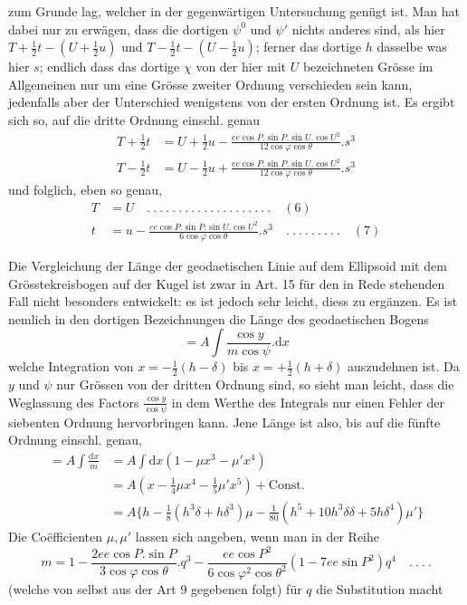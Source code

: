 %
zum Grunde lag, welcher in der gegenwärtigen Untersuchung genügt ist. Man hat dabei nur zu erwägen, dass die dortigen \(\psi^0\) und \(\psi'\) nichts anderes sind, als hier \(T+\frac12t-(U+\frac12u)\) und \(T-\frac12t-(U-\frac12u)\); ferner das dortige \(h\) dasselbe was hier \(s\); endlich dass das dortige \(\chi\) von der hier mit \(U\) bezeichneten Grösse im Allgemeinen nur um eine Grösse zweiter Ordnung verschieden sein kann, jedenfalls aber der Unterschied wenigstens von der ersten Ordnung ist. Es ergibt sich so, auf die dritte Ordnung einschl. genau
\[
\begin{aligned}
T+\tfrac12t&=U+\tfrac12u-\frac{ee\cos P\mathord{.}\sin P\mathord{.}\sin U\mathord{.}\cos U^2}{12\cos\varphi\cos\theta}\mathord{.}s^3\\
T-\tfrac12t&=U-\tfrac12u+\frac{ee\cos P\mathord{.}\sin P\mathord{.}\sin U\mathord{.}\cos U^2}{12\cos\varphi\cos\theta}\mathord{.}s^3
\end{aligned}
\]
und folglich, eben so genau,
\[
\begin{aligned}
T&=U\quad .\ .\ .\ .\ .\ .\ .\ .\ .\ .\ .\ .\ .\ .\ .\ .\ .\ .\ .\ .\quad(6)\\
t&=u-\frac{ee\cos P\mathord{.}\sin P\mathord{.}\sin U\mathord{.}\cos U^2}{6\cos\varphi\cos\theta}\mathord{.}s^3\quad .\ .\ .\ .\ .\ .\ .\ .\ .\quad(7)
\end{aligned}
\]

\indent Die Vergleichung der Länge der geodaetischen Linie auf dem Ellipsoid mit dem Grösstekreisbogen auf der Kugel ist zwar in Art. 15 für den in Rede stehenden Fall nicht besonders entwickelt: es ist jedoch sehr leicht, diess zu ergänzen. Es ist nemlich in den dortigen Bezeichnungen die Länge des geodaetischen Bogens
\[
=A\int\frac{\cos y}{m\cos\psi}\mathord{.}\mathrm{d}x
\]
welche Integration von \(x=-\frac12(h-\delta)\) bis \(x=+\frac12(h+\delta)\) auszudehnen ist. Da \(y\) und \(\psi\) nur Grössen von der dritten Ordnung sind, so sieht man leicht, dass die Weglassung des Factors \(\frac{\cos y}{\cos\psi}\) in dem Werthe des Integrals nur einen Fehler der siebenten Ordnung hervorbringen kann. Jene Länge ist also, bis auf die fünfte Ordnung einschl. genau,
\[
\begin{aligned}
=A\int\frac{\mathrm{d}x}{m}&=A\int\mathrm{d}x(1-\mu x^3-\mu'x^4)\\
&=A(x-\tfrac14\mu x^4-\tfrac15\mu'x^5)+\text{Const.}\\
&=A\{h-\tfrac18(h^3\delta+h\delta^3)\mu-\tfrac1{80}(h^5+10h^3\delta\delta+5h\delta^4)\mu'\}
\end{aligned}
\]
Die Coëfficienten \(\mu,\mu'\) lassen sich angeben, wenn man in der Reihe
\[
m=1-\frac{2ee\cos P\mathord{.}\sin P}{3\cos\varphi\cos\theta}\mathord{.}q^3-\frac{ee\cos P^2}{6\cos\varphi^2\cos\theta^2}(1-7ee\sin P^2)q^4\quad .\ .\ .\ .
\]
(welche von selbst aus der Art 9 gegebenen folgt) für \(q\) die Substitution macht
